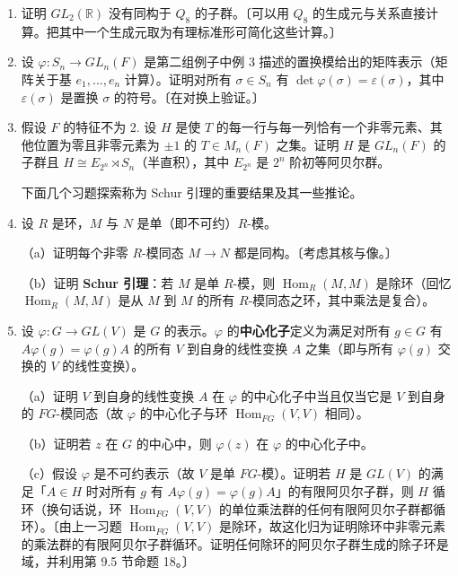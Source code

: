 \begin{enumerate}
\item 证明 \(GL_2(\mathbb{R})\) 没有同构于 \(Q_8\) 的子群。〔可以用 \(Q_8\) 的生成元与关系直接计算。把其中一个生成元取为有理标准形可简化这些计算。〕

\item 设 \(\varphi : S_n \to GL_n(F)\) 是第二组例子中例 3 描述的置换模给出的矩阵表示（矩阵关于基 \(e_1, \ldots, e_n\) 计算）。证明对所有 \(\sigma \in S_n\) 有 \(\det\varphi(\sigma) = \varepsilon(\sigma)\)，其中 \(\varepsilon(\sigma)\) 是置换 \(\sigma\) 的符号。〔在对换上验证。〕

\item 假设 \(F\) 的特征不为 2. 设 \(H\) 是使 \(T\) 的每一行与每一列恰有一个非零元素、其他位置为零且非零元素为 \(\pm1\) 的 \(T \in M_n(F)\) 之集。证明 \(H\) 是 \(GL_n(F)\) 的子群且 \(H \cong E_{2^n} \rtimes S_n\)（半直积），其中 \(E_{2^n}\) 是 \(2^n\) 阶初等阿贝尔群。

\noindent 下面几个习题探索称为 Schur 引理的重要结果及其一些推论。

\item 设 \(R\) 是环，\(M\) 与 \(N\) 是单（即不可约）\(R\)-模。

（a）证明每个非零 \(R\)-模同态 \(M \to N\) 都是同构。〔考虑其核与像。〕

（b）证明 \textbf{Schur 引理}：若 \(M\) 是单 \(R\)-模，则 \(\operatorname{Hom}_R(M, M)\) 是除环（回忆 \(\operatorname{Hom}_R(M,M)\) 是从 \(M\) 到 \(M\) 的所有 \(R\)-模同态之环，其中乘法是复合）。

\item 设 \(\varphi : G \to GL(V)\) 是 \(G\) 的表示。\(\varphi\) 的\textbf{中心化子}定义为满足对所有 \(g \in G\) 有 \(A\varphi(g) = \varphi(g)A\) 的所有 \(V\) 到自身的线性变换 \(A\) 之集（即与所有 \(\varphi(g)\) 交换的 \(V\) 的线性变换）。

（a）证明 \(V\) 到自身的线性变换 \(A\) 在 \(\varphi\) 的中心化子中当且仅当它是 \(V\) 到自身的 \(FG\)-模同态（故 \(\varphi\) 的中心化子与环 \(\operatorname{Hom}_{FG}(V,V)\) 相同）。

（b）证明若 \(z\) 在 \(G\) 的中心中，则 \(\varphi(z)\) 在 \(\varphi\) 的中心化子中。

（c）假设 \(\varphi\) 是不可约表示（故 \(V\) 是单 \(FG\)-模）。证明若 \(H\) 是 \(GL(V)\) 的满足「\(A \in H\) 时对所有 \(g\) 有 \(A\varphi(g) = \varphi(g)A\)」的有限阿贝尔子群，则 \(H\) 循环（换句话说，环 \(\operatorname{Hom}_{FG}(V,V)\) 的单位乘法群的任何有限阿贝尔子群都循环）。〔由上一习题 \(\operatorname{Hom}_{FG}(V,V)\) 是除环，故这化归为证明除环中非零元素的乘法群的有限阿贝尔子群循环。证明任何除环的阿贝尔子群生成的除子环是域，并利用第 9.5 节命题 18。〕


\end{enumerate}
